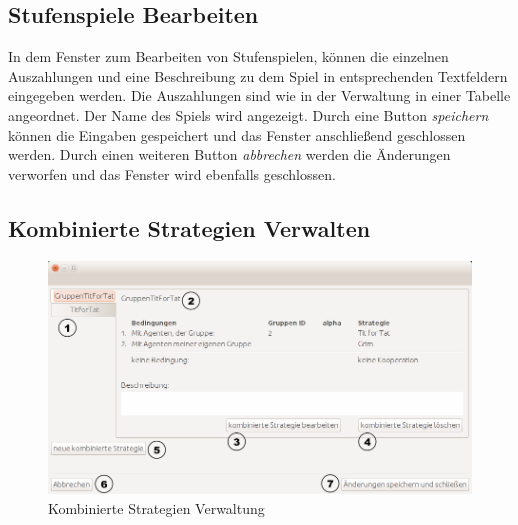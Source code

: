 \subsection{Stufenspiele Bearbeiten}

In dem Fenster zum Bearbeiten von Stufenspielen, können die einzelnen Auszahlungen und eine Beschreibung zu dem Spiel in entsprechenden Textfeldern eingegeben werden. Die Auszahlungen sind wie in der Verwaltung in einer Tabelle angeordnet. Der Name des Spiels wird angezeigt.
Durch eine Button \textit{speichern} können die Eingaben gespeichert und das Fenster anschließend geschlossen werden.  Durch einen weiteren Button \textit{abbrechen} werden die Änderungen verworfen und das Fenster wird ebenfalls  geschlossen.  

\pagebreak

\subsection{Kombinierte Strategien Verwalten}


\begin{figure}[!hp]
  \centering
     \includegraphics[width=1.15\textwidth]{GUI_Entwurf/StrategienVerwalten.png}
  \caption{Kombinierte Strategien Verwaltung}
  \label{fig:Bild1}
\end{figure}

